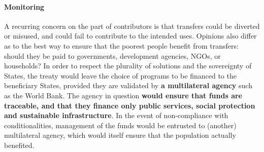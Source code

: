\documentclass[12pt,english]{article}
\begin{document}
\paragraph{Monitoring}
A recurring concern on the part of contributors is that transfers could be diverted or misused, and could fail to contribute to the intended uses. Opinions also differ as to the best way to ensure that the poorest people benefit from transfers: should they be paid to governments, development agencies, NGOs, or households? 
In order to respect the plurality of solutions and the sovereignty of States, the treaty would leave the choice of programs to be financed to the beneficiary States, provided they are validated by \textbf{a multilateral agency} such as the World Bank. The agency in question \textbf{would ensure that funds are traceable, and that they finance only public services, social protection and sustainable infrastructure}. In the event of non-compliance with conditionalities, management of the funds would be entrusted to (another) multilateral agency, which would itself ensure that the population actually benefited.
\end{document}
